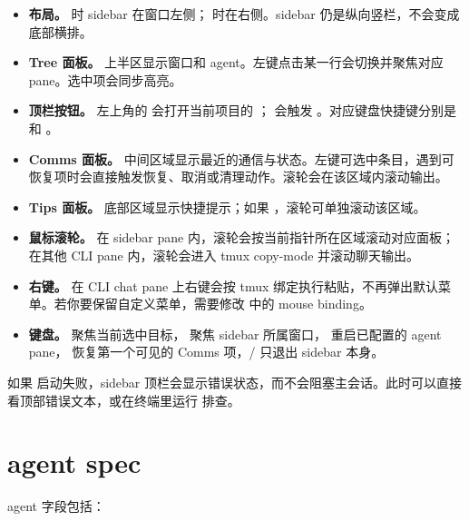 \begin{itemize}
  \item \textbf{布局。}  时 sidebar 在窗口左侧； 时在右侧。sidebar 仍是纵向竖栏，不会变成底部横排。
  \item \textbf{Tree 面板。} 上半区显示窗口和 agent。左键点击某一行会切换并聚焦对应 pane。选中项会同步高亮。
  \item \textbf{顶栏按钮。} 左上角的  会打开当前项目的 ； 会触发 。对应键盘快捷键分别是  和 。
  \item \textbf{Comms 面板。} 中间区域显示最近的通信与状态。左键可选中条目，遇到可恢复项时会直接触发恢复、取消或清理动作。滚轮会在该区域内滚动输出。
  \item \textbf{Tips 面板。} 底部区域显示快捷提示；如果 ，滚轮可单独滚动该区域。
  \item \textbf{鼠标滚轮。} 在 sidebar pane 内，滚轮会按当前指针所在区域滚动对应面板；在其他 CLI pane 内，滚轮会进入 tmux copy-mode 并滚动聊天输出。
  \item \textbf{右键。} 在 CLI chat pane 上右键会按 tmux 绑定执行粘贴，不再弹出默认菜单。若你要保留自定义菜单，需要修改  中的 mouse binding。
  \item \textbf{键盘。}  聚焦当前选中目标， 聚焦 sidebar 所属窗口， 重启已配置的 agent pane， 恢复第一个可见的 Comms 项，/ 只退出 sidebar 本身。
\end{itemize}

如果  启动失败，sidebar 顶栏会显示错误状态，而不会阻塞主会话。此时可以直接看顶部错误文本，或在终端里运行  排查。

\section{agent spec}

agent 字段包括：

